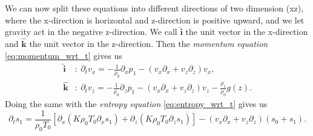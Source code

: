 \documentclass{article}
\begin{document}
We can now split these equations into different directions of two dimension (xz), where the x-direction is horizontal and z-direction is positive upward, and we let gravity act in the negative z-direction. We call $\mathbf{\hat{i}}$ the unit vector in the x-direction and $\mathbf{\hat{k}}$ the unit vector in the z-direction. Then the \textit{momentum equation} \ref{eq:momentum_wrt_t} gives us
\begin{align}
    \mathbf{\hat{i}}&:\ \partial_t v_x = -\frac{1}{\rho_0}\partial_x p_1 - (v_x\partial_x + v_z\partial_z)v_x, \\
    \mathbf{\hat{k}}&:\ \partial_t v_z = -\frac{1}{\rho_0}\partial_z p_1 - (v_x\partial_x + v_z\partial_z)v_z - \frac{\rho_1}{\rho_0}g(z).
\end{align}
Doing the same with the \textit{entropy equation} \ref{eq:entropy_wrt_t} gives us
\begin{equation}
    \partial_t s_1 = \frac{1}{\rho_0 T_0}\left[ \partial_x (K\rho_0T_0\partial_xs_1) + \partial_z (K\rho_0T_0\partial_z s_1)\right] - (v_x\partial_x+v_z\partial_z)(s_0+s_1).
\end{equation}








\end{document}
